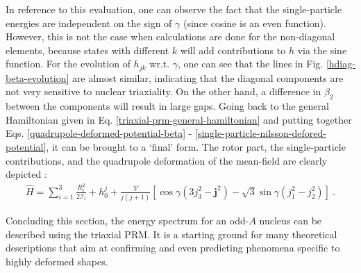 In reference to this evaluation, one can observe the fact that the single-particle energies are independent on the sign of $\gamma$ (since cosine is an even function). However, this is not the case when calculations are done for the non-diagonal elements, because states with different $k$ will add contributions to $h$ via the sine function. For the evolution of $h_{jk}$ wr.t. $\gamma$, one can see that the lines in Fig. \ref{hdiag-beta-evolution} are almost similar, indicating that the diagonal components are not very sensitive to nuclear triaxiality. On the other hand, a difference in $\beta_2$ between the components will result in large gaps. Going back to the general Hamiltonian given in Eq. \ref{triaxial-prm-general-hamiltonian} and putting together Eqs. \ref{quadrupole-deformed-potential-beta} - \ref{single-particle-nilsson-defored-potential}, it can be brought to a `final' form. The rotor part, the single-particle contributions, and the quadrupole deformation of the mean-field are clearly depicted \cite{ring2004nuclear}:
\begin{align}
    \hat{H}=\sum_{i=1}^3\frac{R_i^2}{2\mathcal{I}_i}+h_0^j+\frac{V}{j(j+1)}\left[\cos\gamma(3j_3^2-\mathbf{j}^2)-\sqrt{3}\sin\gamma(j_1^2-j_2^2)\right]\ .
    \label{eq-triaxial-prm-full-hamiltonian}
\end{align}


Concluding this section, the energy spectrum for an odd-$A$ nucleus can be described using the triaxial PRM. It is a starting ground for many theoretical descriptions that aim at confirming and even predicting phenomena specific to highly deformed shapes.

